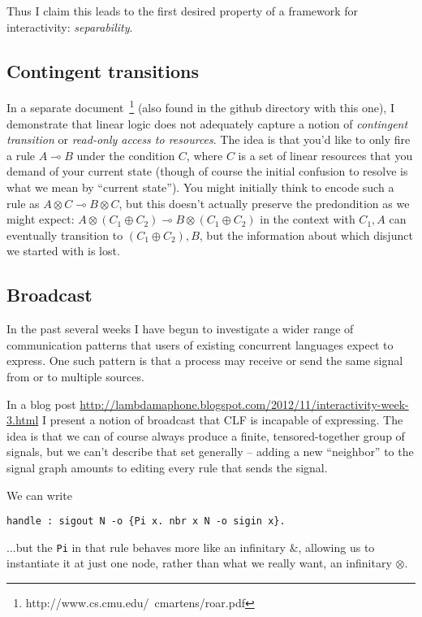 \documentclass{article}
\newcommand{\lolli}{\multimap}
\newcommand{\tensor}{\otimes}
\begin{document}
Thus I claim this leads to the first desired property of a framework for
interactivity: {\em separability}.

\subsection{Contingent transitions}

In a separate document~\footnote{http://www.cs.cmu.edu/~cmartens/roar.pdf}
(also found in the github directory with this one), I demonstrate
that linear logic does not adequately capture a notion of {\em contingent
transition} or {\em read-only access to resources}. The idea is that you'd
like to only fire a rule $A \lolli B$ under the condition $C$, where $C$ is
a set of linear resources that you demand of your current state (though of
course the initial confusion to resolve is what we mean by ``current
state''). You might initially think to encode such a rule as $A\tensor C \lolli B
\tensor C$, but this doesn't actually preserve the predondition as we might
expect: $A \tensor (C_1\oplus C_2) \lolli B \tensor (C_1 \oplus C_2)$ in
the context with $C_1, A$ can eventually transition to $(C_1\oplus C_2),
B$, but the information about which disjunct we started with is lost.

\subsection{Broadcast}

In the past several weeks I have begun to investigate a wider range of
communication patterns that users of existing concurrent languages expect
to express. One such pattern is that a process may receive or send the same
signal from or to multiple sources.

In a blog post
\url{http://lambdamaphone.blogspot.com/2012/11/interactivity-week-3.html} I
present a notion of broadcast that CLF is incapable of expressing. The idea
is that we can of course always produce a finite, tensored-together group
of signals, but we can't describe that set generally -- adding a new
``neighbor'' to the signal graph amounts to editing every rule that sends
the signal.

We can write
\begin{verbatim}
handle : sigout N -o {Pi x. nbr x N -o sigin x}.
\end{verbatim}

...but the \verb|Pi| in that rule behaves more like an infinitary 
$\&$, allowing us to instantiate it at just one node, rather than what we
really want, an infinitary $\tensor$.
\end{document}
